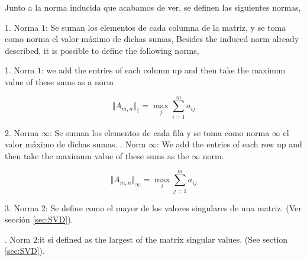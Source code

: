 \begin{paracol}{2}
Junto a la norma inducida que acabamos de ver, se definen las siguientes normas,

1. Norma $1$: Se suman los elementos de cada columna de la matriz, y se toma como norma el valor máximo de dichas sumas,
\switchcolumn
Besides the induced norm already described, it is possible to define the following norms,

1. Norm $1$: we add the entries of each column up and then take the maximun value of these sums as a norm
\end{paracol}
\begin{equation*}
\Vert A_{m,n} \Vert _{1} = \max_j \sum_{i=1}^m a_{ij}
\end{equation*}
\begin{paracol}{2}
2. Norma $\infty$: Se suman los elementos de cada fila y se toma como norma $\infty$ el valor máximo de dichas sumas.
. Norm $\infty$: We add the entries of each row up and then take the maximum value of these sums as the $\infty$ norm.
\end{paracol}
\begin{equation*}
\Vert A_{m,n} \Vert _{\infty} = \max_i \sum_{j=1}^m a_{ij}
\end{equation*}
\begin{paracol}{2}
3. Norma 2: Se define como el mayor de los valores singulares de una matriz. (Ver sección \ref{sec:SVD}).

. Norm $2$:it si defined as the largest of the matrix singular values. (See section \ref{sec:SVD}). 
\end{paracol}

